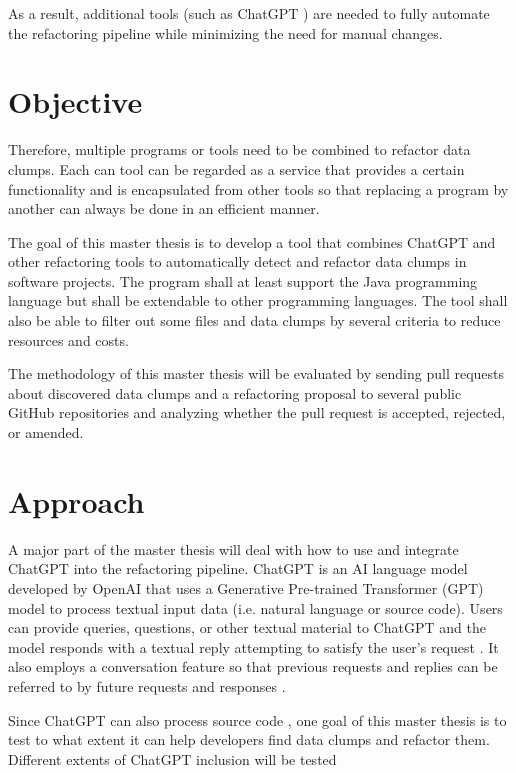 As a result,  additional tools (such as ChatGPT \cite{ChatGPT_url}) are needed to fully automate the refactoring pipeline while minimizing the need for manual changes. 




\section{Objective}

Therefore, multiple programs or tools need to be combined to refactor data clumps. Each can tool can be regarded as  a service that provides a certain functionality and is encapsulated from other tools so that replacing a program by another can always be done in an efficient manner. 


The goal of this master thesis is to develop a tool that  combines ChatGPT and other refactoring tools  to automatically detect and refactor data clumps in software projects. The program  shall at least support the Java programming language but shall be extendable to  other programming languages. The tool shall also  be able to filter out some files and data clumps by several criteria to reduce resources and costs. 

The methodology of this master thesis will be evaluated by sending  pull requests about discovered data clumps and a refactoring proposal to several public GitHub repositories and analyzing whether the pull request is accepted, rejected, or amended.   

\section{Approach}

A major part of the master thesis will deal with how to use and integrate ChatGPT into the refactoring pipeline. 
ChatGPT is an AI language model developed by OpenAI that uses a Generative Pre-trained Transformer (GPT) model to process textual input data (i.e. natural language or source code). Users can provide queries, questions, or other textual material to ChatGPT and the model responds with a textual reply attempting to satisfy the user's request \cite{yetistirenEvaluatingCodeQuality2023}. It also employs a conversation feature so that previous requests and replies can be referred to by future requests and responses \cite{sobania2023analysis}.

Since ChatGPT can also process source code \cite{sadik2023analysis}\cite{guo2023exploring}, one goal of this master thesis is to test to what extent it can help developers find data clumps and refactor them. Different extents of ChatGPT inclusion will be tested  

